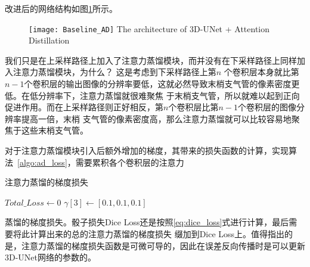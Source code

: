改进后的网络结构如图\ref{fig:3dunet_ad}所示。
\begin{figure}[ht]
    \centering
    \texttt{[image: Baseline\_AD]}
        {The architecture of 3D-UNet + Attention Distillation}
    \label{fig:3dunet_ad}
\end{figure}
我们只是在上采样路径上加入了注意力蒸馏模块，而并没有在下采样路径上同样加入注意力蒸馏模块，为什么？ 这是考虑到下采样路径上第$n$
个卷积层本身就比第$n-1$个卷积层的输出图像的分辨率要低，这就必然导致末梢支气管的像素密度更低。在低分辨率下，注意力蒸馏就很难聚焦
于末梢支气管，所以就难以起到正向促进作用。而在上采样路径则正好相反，第$n$个卷积层比第$n-1$个卷积层的图像分辨率提高一倍，末梢
支气管的像素密度高，那么注意力蒸馏就可以比较容易地聚焦于这些末梢支气管。

对于注意力蒸馏模块引入后额外增加的梯度，其带来的损失函数的计算，实现算法~\ref{algo:ad_loss}，需要累积各个卷积层的注意力
\begin{algorithm}[htb]
    
    \caption{注意力蒸馏的梯度损失}
    \label{algo:ad_loss}
    \small
    \SetAlgoLined
    
    $Total\_Loss \leftarrow 0$
    \BlankLine
    $\gamma[3] \leftarrow [0.1, 0.1, 0.1]$
    \BlankLine
    
\end{algorithm}
蒸馏的梯度损失。骰子损失Dice Loss还是按照\ref{eq:dice_loss}式进行计算，最后需要将此计算出来的总的注意力蒸馏的梯度损失
缀加到Dice Loss上。值得指出的是，注意力蒸馏的梯度损失函数是可微可导的，因此在误差反向传播时是可以更新3D-UNet网络的参数的。

